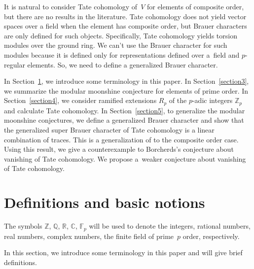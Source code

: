 \documentclass[10pt,a4paper]{amsart}
\numberwithin{equation}{section}
\begin{document}
It is natural to consider Tate cohomology of~$V$ for elements of composite order, but there are no results in the literature. Tate cohomology does not yield vector spaces over a field when the element has composite order, but Brauer characters are only defined for such objects. Specifically, Tate cohomology yields torsion modules over the ground ring. We can't use the Brauer character for such modules because it is defined only for representations defined over a~field and $p$-regular elements. So, we need to define a generalized Brauer character.

In Section~\ref{section2}, we introduce some terminology in this paper. In Section~\ref{section3}, we summarize the modular moonshine conjecture for elements of prime order. In Section~\ref{section4}, we consider ramified extensions $R_p$ of the $p$-adic integers $\mathbb{Z}_p$ and calculate Tate cohomology. In Section~\ref{section5}, to generalize the modular moonshine conjectures, we define a generalized Brauer character and show that the generalized super Brauer character of Tate cohomology is a linear combination of traces. This is a generalization of \cite[Proposition~2.2]{BR} to the composite order case. Using this result, we give a counterexample to Borcherds's conjecture about vanishing of Tate cohomology. We propose a~weaker conjecture about vanishing of Tate cohomology.


\section{Definitions and basic notions}\label{section2}
 The symbols $\mathbb{Z}$, $\mathbb{Q}$, $\mathbb{R}$, $\mathbb{C}$, $\mathbb{F}_p$ will be used to denote the integers, rational numbers, real numbers, complex numbers, the finite field of prime~$p$ order, respectively.

 In this section, we introduce some terminology in this paper and will give brief definitions.
\end{document}
